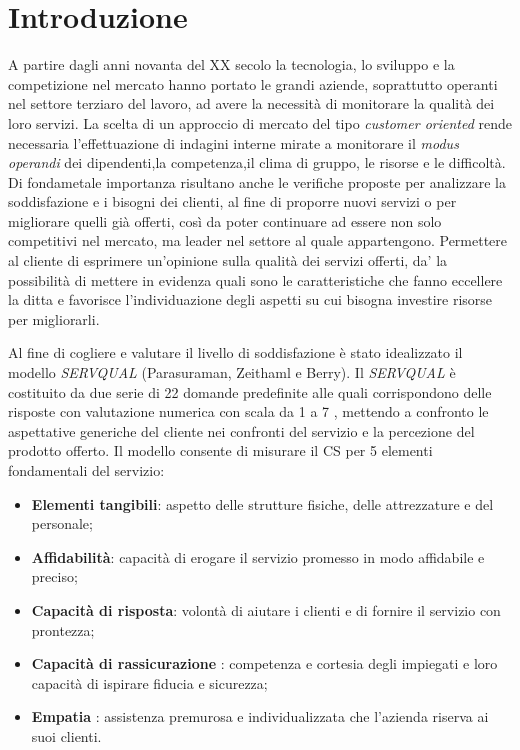 \section{Introduzione}
A partire dagli anni novanta del XX secolo la tecnologia, lo sviluppo e la
competizione nel mercato hanno portato le grandi aziende, soprattutto operanti nel settore
terziaro del lavoro, ad avere la necessità di monitorare la qualità dei loro
servizi. 
La scelta di un approccio di mercato del tipo \textit{customer
oriented} rende necessaria l'effettuazione di indagini interne
mirate a monitorare il \textit{modus operandi} dei dipendenti,la competenza,il clima di gruppo, le
risorse e le difficoltà. Di fondametale importanza risultano anche le verifiche
proposte per analizzare la soddisfazione e i bisogni dei clienti, al fine di
proporre nuovi servizi o per migliorare quelli già offerti, così da poter
continuare ad essere non solo competitivi nel mercato, ma leader nel settore al
quale appartengono. Permettere al cliente di esprimere un'opinione sulla qualità
dei servizi offerti, da' la possibilità di mettere in evidenza quali sono le
caratteristiche che fanno eccellere la ditta e favorisce l'individuazione degli
aspetti su cui bisogna investire risorse per migliorarli.

Al fine di cogliere e valutare il livello di soddisfazione è stato idealizzato
il modello \textit{SERVQUAL} (Parasuraman, Zeithaml e Berry). Il
\textit{SERVQUAL} è costituito da due serie di 22 domande predefinite alle quali
corrispondono delle risposte con valutazione numerica con scala da 1 a 7 ,
mettendo a confronto le aspettative generiche del cliente nei confronti del
servizio e la percezione del prodotto offerto.
Il modello  consente di misurare il CS per 5 elementi fondamentali del
servizio: 
\begin{itemize}
  \item \textbf{Elementi tangibili}: aspetto delle strutture fisiche,
  delle attrezzature e del personale;
  \item \textbf{Affidabilità}: capacità di erogare il servizio promesso
  in modo affidabile e preciso;
  \item \textbf{Capacità di risposta}: volontà di aiutare i clienti e di
  fornire il servizio con prontezza;
  \item \textbf{Capacità di rassicurazione} : competenza e cortesia
  degli impiegati e loro capacità di  ispirare fiducia e sicurezza;
  \item \textbf{Empatia} : assistenza premurosa e individualizzata che
  l’azienda riserva ai suoi clienti.
\end{itemize}

